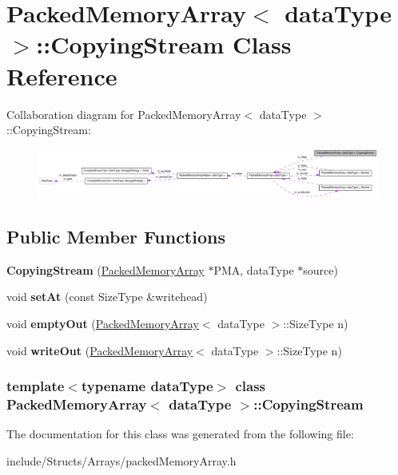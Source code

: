 \hypertarget{class_packed_memory_array_1_1_copying_stream}{
\section{PackedMemoryArray$<$ dataType $>$::CopyingStream Class Reference}
\label{class_packed_memory_array_1_1_copying_stream}
}


Collaboration diagram for PackedMemoryArray$<$ dataType $>$::CopyingStream:\nopagebreak
\begin{figure}[H]
\begin{center}
\leavevmode
\includegraphics[width=400pt]{class_packed_memory_array_1_1_copying_stream__coll__graph}
\end{center}
\end{figure}
\subsection*{Public Member Functions}
\begin{DoxyCompactItemize}
\item 
\hypertarget{class_packed_memory_array_1_1_copying_stream_a4805c7df3ab25e9ffda0a4a9188d5021}{
{\bfseries CopyingStream} (\hyperlink{class_packed_memory_array}{PackedMemoryArray} $\ast$PMA, dataType $\ast$source)}
\label{class_packed_memory_array_1_1_copying_stream_a4805c7df3ab25e9ffda0a4a9188d5021}

\item 
\hypertarget{class_packed_memory_array_1_1_copying_stream_a1fa1044299ee35d3c8af1704c198342f}{
void {\bfseries setAt} (const SizeType \&writehead)}
\label{class_packed_memory_array_1_1_copying_stream_a1fa1044299ee35d3c8af1704c198342f}

\item 
\hypertarget{class_packed_memory_array_1_1_copying_stream_aae728cdc41d6e26b1a79864c1a2554f1}{
void {\bfseries emptyOut} (\hyperlink{class_packed_memory_array}{PackedMemoryArray}$<$ dataType $>$::SizeType n)}
\label{class_packed_memory_array_1_1_copying_stream_aae728cdc41d6e26b1a79864c1a2554f1}

\item 
\hypertarget{class_packed_memory_array_1_1_copying_stream_a4431d3df84da340be5087d7281d8642d}{
void {\bfseries writeOut} (\hyperlink{class_packed_memory_array}{PackedMemoryArray}$<$ dataType $>$::SizeType n)}
\label{class_packed_memory_array_1_1_copying_stream_a4431d3df84da340be5087d7281d8642d}

\end{DoxyCompactItemize}
\subsubsection*{template$<$typename dataType$>$ class PackedMemoryArray$<$ dataType $>$::CopyingStream}



The documentation for this class was generated from the following file:\begin{DoxyCompactItemize}
\item 
include/Structs/Arrays/packedMemoryArray.h\end{DoxyCompactItemize}
